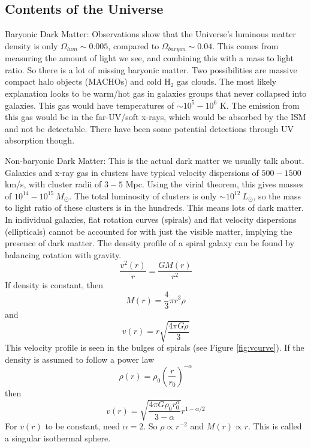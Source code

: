 \subsection{Contents of the Universe}
Baryonic Dark Matter:\newline
Observations show that the Universe's luminous matter density is only 
$\Omega_{lum}\sim0.005$, compared to $\Omega_{baryon}\sim0.04$.  This comes 
from measuring the amount of light we see, and combining this with a mass to 
light ratio.  So there is a lot of missing baryonic matter.  Two possibilities 
are massive compact halo objects (MACHOs) and cold H$_2$ gas clouds.  The most 
likely explanation looks to be warm/hot gas in galaxies groups that never 
collapsed into galaxies.  This gas would have temperatures of $\sim10^5-10^6$ 
K.  The emission from this gas would be in the far-UV/soft x-rays, which would 
be absorbed by the ISM and not be detectable.  There have been some potential 
detections through UV absorption though.  

Non-baryonic Dark Matter:\newline
This is the actual dark matter we usually talk about.  Galaxies and x-ray 
gas in clusters have typical velocity dispersions of $500-1500$ km/s, with 
cluster radii of $3-5$ Mpc.  Using the virial theorem, this gives masses 
of $10^{14}-10^{15}\ M_{\odot}$.  The total luminosity of clusters is only 
$\sim10^{12}\ L_{\odot}$, so the mass to light ratio of these clusters 
is in the hundreds.  This means lots of dark matter.  In individual galaxies, 
flat rotation curves (spirals) and flat velocity dispersions (ellipticals) 
cannot be accounted for with just the visible matter, implying the presence of 
dark matter.  The density profile of a spiral galaxy can be found by 
balancing rotation with gravity.  
\begin{equation}
\frac{v^2(r)}{r}=\frac{GM(r)}{r^2}
\end{equation}
If density is constant, then
\begin{equation}
M(r)=\frac{4}{3}\pi r^3\rho
\end{equation}
and
\begin{equation}
v(r)=r\sqrt{\frac{4\pi G\rho}{3}}
\end{equation}
This velocity profile is seen in the bulges of spirals (see Figure 
\ref{fig:vcurve}).  If the density is assumed to follow a power law
\begin{equation}
\rho(r)=\rho_0\left(\frac{r}{r_0}\right)^{-\alpha}
\end{equation}
then
\begin{equation}
v(r)=\sqrt{\frac{4\pi G\rho_0r_0^{\alpha}}{3-\alpha}}r^{1-\alpha/2}
\end{equation}
For $v(r)$ to be constant, need $\alpha=2$.  So $\rho\propto r^{-2}$ and 
$M(r)\propto r$.  This is called a singular isothermal sphere.

